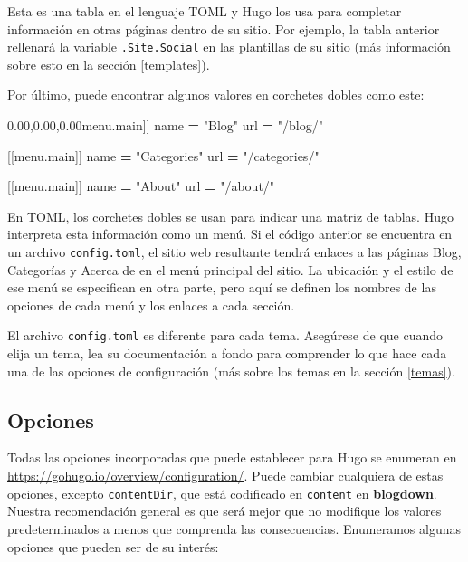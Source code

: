\documentclass[12pt,]{krantz}
\makeatletter
\newenvironment{Shaded}{\begin{snugshade}}{\end{snugshade}}
\newcommand{\AttributeTok}[1]{\textcolor[rgb]{0.77,0.63,0.00}{#1}}
\newcommand{\NormalTok}[1]{#1}
\newcommand{\OperatorTok}[1]{\textcolor[rgb]{0.81,0.36,0.00}{\textbf{#1}}}
\newcommand{\StringTok}[1]{\textcolor[rgb]{0.31,0.60,0.02}{#1}}
\newcommand{\VariableTok}[1]{\textcolor[rgb]{0.00,0.00,0.00}{#1}}
\newenvironment{kframe}{%
\medskip{}
\setlength{\fboxsep}{.8em}
 \def\at@end@of@kframe{}%
 \ifinner\ifhmode%
  \def\at@end@of@kframe{\end{minipage}}%
  \begin{minipage}{\columnwidth}%
 \fi\fi%
 \def\FrameCommand##1{\hskip\@totalleftmargin \hskip-\fboxsep
 \colorbox{shadecolor}{##1}\hskip-\fboxsep
     \hskip-\linewidth \hskip-\@totalleftmargin \hskip\columnwidth}%
 \MakeFramed {\advance\hsize-\width
   \@totalleftmargin\z@ \linewidth\hsize
   \@setminipage}}%
 {\par\unskip\endMakeFramed%
 \at@end@of@kframe}
\renewenvironment{Shaded}{\begin{kframe}}{\end{kframe}}
\theoremstyle{definition}
\theoremstyle{definition}
\theoremstyle{definition}
\theoremstyle{remark}
\makeatother
\begin{document}
Esta es una tabla en el lenguaje TOML y Hugo los usa para completar
información en otras páginas dentro de su sitio. Por ejemplo, la tabla
anterior rellenará la variable \texttt{.Site.Social} en las plantillas
de su sitio (más información sobre esto en la sección \ref{templates}).

Por último, puede encontrar algunos valores en corchetes dobles como
este:

\begin{Shaded}
\begin{Highlighting}[]
\NormalTok{[[}\VariableTok{menu}\NormalTok{.}\AttributeTok{main}\NormalTok{]]}
\NormalTok{    name }\OperatorTok{=} \StringTok{"Blog"}
\NormalTok{    url }\OperatorTok{=} \StringTok{"/blog/"}

\NormalTok{[[}\VariableTok{menu}\NormalTok{.}\AttributeTok{main}\NormalTok{]]}
\NormalTok{    name }\OperatorTok{=} \StringTok{"Categories"}
\NormalTok{    url }\OperatorTok{=} \StringTok{"/categories/"}

\NormalTok{[[}\VariableTok{menu}\NormalTok{.}\AttributeTok{main}\NormalTok{]]}
\NormalTok{    name }\OperatorTok{=} \StringTok{"About"}
\NormalTok{    url }\OperatorTok{=} \StringTok{"/about/"}
\end{Highlighting}
\end{Shaded}

En TOML, los corchetes dobles se usan para indicar una matriz de tablas.
Hugo interpreta esta información como un menú. Si el código anterior se
encuentra en un archivo \texttt{config.toml}, el sitio web resultante
tendrá enlaces a las páginas Blog, Categorías y Acerca de en el menú
principal del sitio. La ubicación y el estilo de ese menú se especifican
en otra parte, pero aquí se definen los nombres de las opciones de cada
menú y los enlaces a cada sección.

El archivo \texttt{config.toml} es diferente para cada tema. Asegúrese
de que cuando elija un tema, lea su documentación a fondo para
comprender lo que hace cada una de las opciones de configuración (más
sobre los temas en la sección \ref{temas}).

\hypertarget{opciones}{%
\subsection{Opciones}\label{opciones}}

Todas las opciones incorporadas que puede establecer
para Hugo se enumeran en
\url{https://gohugo.io/overview/configuration/}. Puede cambiar
cualquiera de estas opciones, excepto \texttt{contentDir}, que está
codificado en \texttt{content} en \textbf{blogdown}. Nuestra
recomendación general es que será mejor que no modifique los valores
predeterminados a menos que comprenda las consecuencias. Enumeramos
algunas opciones que pueden ser de su interés:
\end{document}
